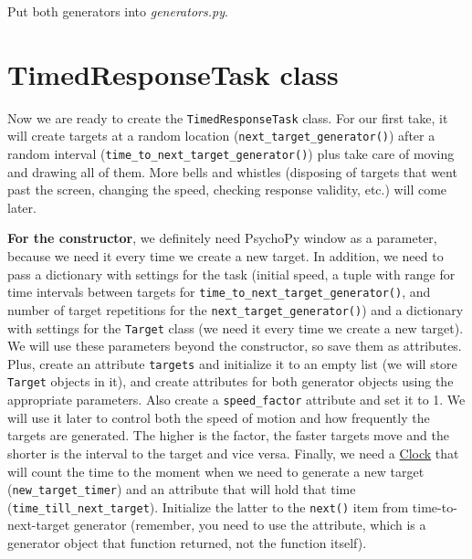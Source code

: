 \documentclass[
]{book}
\begin{document}
Put both generators into \emph{generators.py}.

\hypertarget{timedresponsetask-class}{%
\section{TimedResponseTask class}\label{timedresponsetask-class}}

Now we are ready to create the \texttt{TimedResponseTask} class. For our first take, it will create targets at a random location (\texttt{next\_target\_generator()}) after a random interval (\texttt{time\_to\_next\_target\_generator()}) plus take care of moving and drawing all of them. More bells and whistles (disposing of targets that went past the screen, changing the speed, checking response validity, etc.) will come later.

\textbf{For the constructor}, we definitely need PsychoPy window as a parameter, because we need it every time we create a new target. In addition, we need to pass a dictionary with settings for the task (initial speed, a tuple with range for time intervals between targets for \texttt{time\_to\_next\_target\_generator()}, and number of target repetitions for the \texttt{next\_target\_generator()}) and a dictionary with settings for the \texttt{Target} class (we need it every time we create a new target). We will use these parameters beyond the constructor, so save them as attributes. Plus, create an attribute \texttt{targets} and initialize it to an empty list (we will store \texttt{Target} objects in it), and create attributes for both generator objects using the appropriate parameters. Also create a \texttt{speed\_factor} attribute and set it to 1. We will use it later to control both the speed of motion and how frequently the targets are generated. The higher is the factor, the faster targets move and the shorter is the interval to the target and vice versa. Finally, we need a \href{https://psychopy.org/api/clock.html\#psychopy.clock.Clock}{Clock} that will count the time to the moment when we need to generate a new target (\texttt{new\_target\_timer}) and an attribute that will hold that time (\texttt{time\_till\_next\_target}). Initialize the latter to the \texttt{next()} item from time-to-next-target generator (remember, you need to use the attribute, which is a generator object that function returned, not the function itself).
\end{document}
